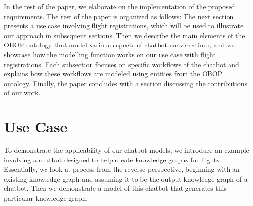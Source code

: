 \documentclass[runningheads]{llncs}
\begin{document}

In the rest of the paper, we elaborate on the implementation of the proposed requirements. The rest of the paper is organized as follows: The next section presents a use case involving flight registrations, which will be used to illustrate our approach in subsequent sections. Then we describe the main elements of the OBOP ontology that model various aspects of chatbot conversations, and we showcase how the modelling function works on our use case with flight registrations. Each subsection focuses on specific workflows of the chatbot and explains how these workflows are modeled using entities from the OBOP ontology. Finally, the paper concludes with a section discussing the contributions of our work.
\section{Use Case}
To demonstrate the applicability of our chatbot models, we introduce an example involving a chatbot designed to help create knowledge graphs for flights. Essentially, we look at process from the reverse perspective, beginning with an existing knowledge graph and assuming it to be the output knowledge graph of a chatbot. Then we demonstrate a model of this chatbot that generates this particular knowledge graph. 
\end{document}
